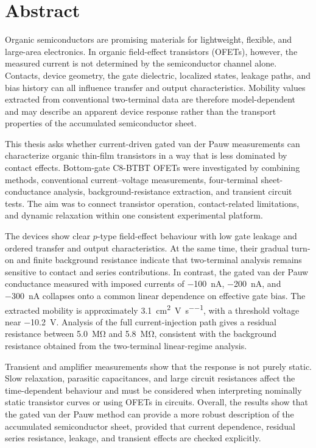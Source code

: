 \chapter*{Abstract}
\thispagestyle{plain}

Organic semiconductors are promising materials for lightweight, flexible, and
large-area electronics. In organic field-effect transistors (OFETs), however,
the measured current is not determined by the semiconductor channel alone.
Contacts, device geometry, the gate dielectric, localized states, leakage paths,
and bias history can all influence transfer and output characteristics. Mobility
values extracted from conventional two-terminal data are therefore
model-dependent and may describe an apparent device response rather than the
transport properties of the accumulated semiconductor sheet.

This thesis asks whether current-driven gated van der Pauw measurements can
characterize organic thin-film transistors in a way that is less dominated by
contact effects. Bottom-gate C8-BTBT OFETs were investigated by
combining methods, conventional current--voltage measurements,
four-terminal sheet-conductance analysis, background-resistance extraction, and
transient circuit tests. The aim was to connect transistor operation,
contact-related limitations, and dynamic relaxation within one consistent
experimental platform.

The devices show clear $p$-type field-effect behaviour with low gate
leakage and ordered transfer and output characteristics. At the same time, their
gradual turn-on and finite background resistance indicate that two-terminal
analysis remains sensitive to contact and series contributions. In contrast, the
gated van der Pauw conductance measured with imposed currents of
\SI{-100}{\nano\ampere}, \SI{-200}{\nano\ampere}, and
\SI{-300}{\nano\ampere} collapses onto a common linear dependence on effective
gate bias. The extracted mobility is approximately
\SI{3.1}{\centi\metre\squared\per\volt\per\second}, with a threshold voltage near
\SI{-10.2}{\volt}. Analysis of the full current-injection path gives a residual
resistance between \SI{5.0}{\mega\ohm} and \SI{5.8}{\mega\ohm}, consistent with
the background resistance obtained from the two-terminal linear-regime analysis.

Transient and amplifier measurements show that the response is not purely
static. Slow relaxation, parasitic capacitances, and large circuit resistances
affect the time-dependent behaviour and must be considered when interpreting
nominally static transistor curves or using OFETs in circuits. Overall, the
results show that the gated van der Pauw method can provide a more robust
description of the accumulated semiconductor sheet, provided that current
dependence, residual series resistance, leakage, and transient effects are
checked explicitly.
